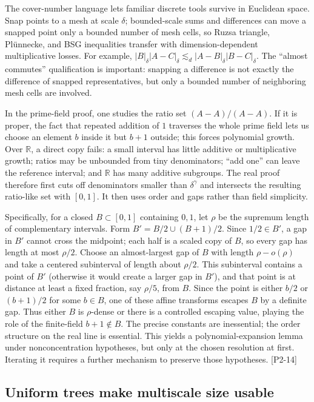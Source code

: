 The cover-number language lets familiar discrete tools survive in Euclidean space. Snap points to a mesh at scale \(\delta\); bounded-scale sums and differences can move a snapped point only a bounded number of mesh cells, so Ruzsa triangle, Plünnecke, and BSG inequalities transfer with dimension-dependent multiplicative losses. For example, \(|B|_\delta|A-C|_\delta\lesssim_d |A-B|_\delta|B-C|_\delta\). The ``almost commutes'' qualification is important: snapping a difference is not exactly the difference of snapped representatives, but only a bounded number of neighboring mesh cells are involved.

In the prime-field proof, one studies the ratio set \((A-A)/(A-A)\). If it is proper, the fact that repeated addition of \(1\) traverses the whole prime field lets us choose an element \(b\) inside it but \(b+1\) outside; this forces polynomial growth. Over \(\mathbb R\), a direct copy fails: a small interval has little additive or multiplicative growth; ratios may be unbounded from tiny denominators; ``add one'' can leave the reference interval; and \(\mathbb R\) has many additive subgroups. The real proof therefore first cuts off denominators smaller than \(\delta^\gamma\) and intersects the resulting ratio-like set with \([0,1]\). It then uses order and gaps rather than field simplicity.

Specifically, for a closed \(B\subset[0,1]\) containing \(0,1\), let \(\rho\) be the supremum length of complementary intervals. Form \(B'=B/2\cup(B+1)/2\). Since \(1/2\in B'\), a gap in \(B'\) cannot cross the midpoint; each half is a scaled copy of \(B\), so every gap has length at most \(\rho/2\). Choose an almost-largest gap of \(B\) with length \(\rho-o(\rho)\) and take a centered subinterval of length about \(\rho/2\). This subinterval contains a point of \(B'\) (otherwise it would create a larger gap in \(B'\)), and that point is at distance at least a fixed fraction, say \(\rho/5\), from \(B\). Since the point is either \(b/2\) or \((b+1)/2\) for some \(b\in B\), one of these affine transforms escapes \(B\) by a definite gap. Thus either \(B\) is \(\rho\)-dense or there is a controlled escaping value, playing the role of the finite-field \(b+1\notin B\). The precise constants are inessential; the order structure on the real line is essential. This yields a polynomial-expansion lemma under nonconcentration hypotheses, but only at the chosen resolution at first. Iterating it requires a further mechanism to preserve those hypotheses. {[}P2-14{]}

\subsection{Uniform trees make multiscale size usable}\label{04-visual-computing-ii-ch033-uniform-trees-make-multiscale-size-usable}


